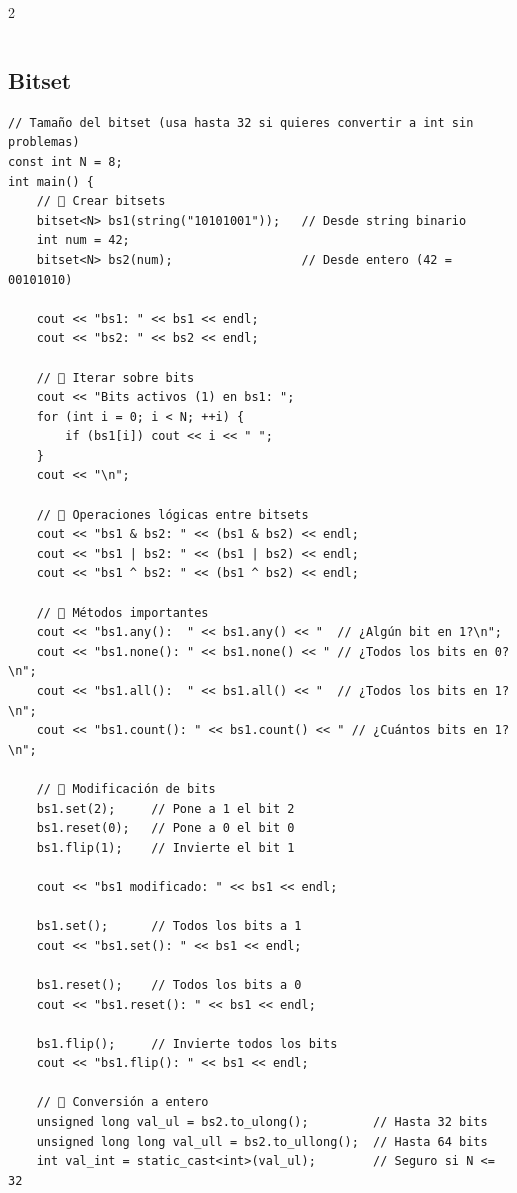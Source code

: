 \documentclass[twoside]{article}
\begin{document}
\begin{multicols*}{2}
\begin{verbatim}
\end{verbatim}

	{
		\subsection*{Bitset}
	}
	\begin{verbatim}
// Tamaño del bitset (usa hasta 32 si quieres convertir a int sin problemas)
const int N = 8;
int main() {
    // 🔹 Crear bitsets
    bitset<N> bs1(string("10101001"));   // Desde string binario
    int num = 42;
    bitset<N> bs2(num);                  // Desde entero (42 = 00101010)

    cout << "bs1: " << bs1 << endl;
    cout << "bs2: " << bs2 << endl;

    // 🔹 Iterar sobre bits
    cout << "Bits activos (1) en bs1: ";
    for (int i = 0; i < N; ++i) {
        if (bs1[i]) cout << i << " ";
    }
    cout << "\n";

    // 🔹 Operaciones lógicas entre bitsets
    cout << "bs1 & bs2: " << (bs1 & bs2) << endl;
    cout << "bs1 | bs2: " << (bs1 | bs2) << endl;
    cout << "bs1 ^ bs2: " << (bs1 ^ bs2) << endl;

    // 🔹 Métodos importantes
    cout << "bs1.any():  " << bs1.any() << "  // ¿Algún bit en 1?\n";
    cout << "bs1.none(): " << bs1.none() << " // ¿Todos los bits en 0?\n";
    cout << "bs1.all():  " << bs1.all() << "  // ¿Todos los bits en 1?\n";
    cout << "bs1.count(): " << bs1.count() << " // ¿Cuántos bits en 1?\n";

    // 🔹 Modificación de bits
    bs1.set(2);     // Pone a 1 el bit 2
    bs1.reset(0);   // Pone a 0 el bit 0
    bs1.flip(1);    // Invierte el bit 1

    cout << "bs1 modificado: " << bs1 << endl;

    bs1.set();      // Todos los bits a 1
    cout << "bs1.set(): " << bs1 << endl;

    bs1.reset();    // Todos los bits a 0
    cout << "bs1.reset(): " << bs1 << endl;

    bs1.flip();     // Invierte todos los bits
    cout << "bs1.flip(): " << bs1 << endl;

    // 🔹 Conversión a entero
    unsigned long val_ul = bs2.to_ulong();         // Hasta 32 bits
    unsigned long long val_ull = bs2.to_ullong();  // Hasta 64 bits
    int val_int = static_cast<int>(val_ul);        // Seguro si N <= 32


\end{verbatim}
\end{multicols*}
\end{document}
